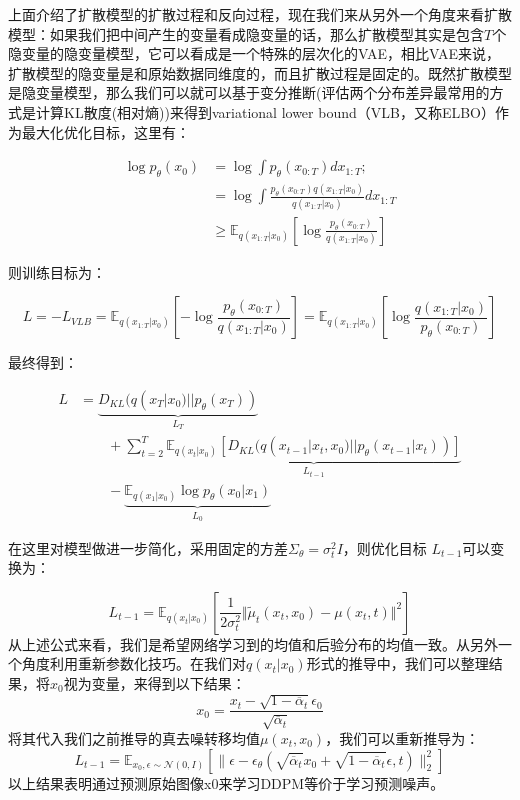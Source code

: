 上面介绍了扩散模型的扩散过程和反向过程，现在我们来从另外一个角度来看扩散模型：如果我们把中间产生的变量看成隐变量的话，那么扩散模型其实是包含$T$个隐变量的隐变量模型，它可以看成是一个特殊的层次化的VAE，相比VAE来说，扩散模型的隐变量是和原始数据同维度的，而且扩散过程是固定的。既然扩散模型是隐变量模型，那么我们可以就可以基于变分推断(评估两个分布差异最常用的方式是计算KL散度(相对熵))来得到variational lower bound（VLB，又称ELBO）作为最大化优化目标，这里有：

$$\begin{aligned}
\log{p_{\theta}(x_0)} &= \log{\int{p_{\theta}(x_{0:T})dx_{1:T}}};\\
&=\log{\int{\frac{p_{\theta}(x_{0:T})q(x_{1:T}|x_0)}{q(x_{1:T}|x_0)}dx_{1:T}}} \\
&\ge \mathbb{E}_{q(x_{1:T}|x_0)}[\log{\frac{p_{\theta}(x_{0:T})}{q(x_{1:T}|x_0)}}]
\end{aligned}$$

则训练目标为：

\begin{equation}\label{eqn-18}
L = - L_{VLB} = \mathbb{E}_{q(x_{1:T}|x_0)}[-\log{\frac{p_{\theta}(x_{0:T})}{q(x_{1:T}|x_0)}}] = \mathbb{E}_{q(x_{1:T}|x_0)}[\log{\frac{q(x_{1:T}|x_0)}{p_{\theta}(x_{0:T})}}]
\end{equation}

最终得到：

$$\begin{aligned}
      L &= \underbrace{D_{KL}(q(x_T|x_0) || p_\theta(x_T))}_{L_T} \\
      &\qquad + \sum^T_{t=2}{\underbrace{\mathbb{E}_{q(x_t|x_0)}[D_{KL}(q(x_{t-1}|x_t,x_0) || p_\theta(x_{t-1}|x_t))]}_{L_{t-1}}} \\
      &\qquad- \underbrace{\mathbb{E}_{q(x_1|x_0)}\log{p_\theta(x_0|x_1)}}_{L_0}
\end{aligned}$$

在这里对模型做进一步简化，采用固定的方差$\Sigma_\theta=\sigma^2_tI$，则优化目标 $L_{t-1}$可以变换为：

\begin{equation}\label{eqn-21}
L_{t-1}=\mathbb{E}_{q(x_t|x_0)}[\frac{1}{2\sigma^2_t}\Vert \widetilde{\mu}_t(x_t,x_0)-\mu(x_t,t) \Vert^2]
\end{equation}
从上述公式来看，我们是希望网络学习到的均值和后验分布的均值一致。从另外一个角度利用重新参数化技巧。在我们对$q ( x_t | x_0 )$形式的推导中，我们可以整理结果，将$x_0$视为变量，来得到以下结果：
\begin{equation}\label{eqn-22}
      x_0 = \frac{x_t - \sqrt{1-\overline{\alpha}_t}\epsilon_0}{\sqrt{\overline{\alpha}_t}}
\end{equation}
将其代入我们之前推导的真去噪转移均值$\mu( x_t , x_0)$，我们可以重新推导为：
\begin{equation}\label{eqn-23}
      L_{t-1}=\mathbb{E}_{x_0,\epsilon \sim \mathcal{N}(0,I)}[\lVert \epsilon - \epsilon_\theta (\sqrt{\overline{\alpha}_t}x_0 + \sqrt{1 - \overline{\alpha}_t}\epsilon,t)\rVert^2_2]
\end{equation}
以上结果表明通过预测原始图像x0来学习DDPM等价于学习预测噪声。
